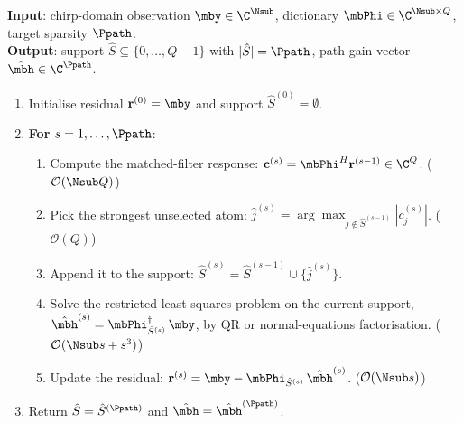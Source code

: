 \begin{algorithm}[t]
\caption{Orthogonal Matching Pursuit on the chirp-domain pilot dictionary~\cite{tropp2007signal}.}
\label{alg:omp}
\begin{small}
\textbf{Input}: chirp-domain observation $\mby \in \C^{\Nsub}$, dictionary $\mbPhi \in \C^{\Nsub \times Q}$, target sparsity $\Ppath$. \\
\textbf{Output}: support $\hat{S} \subseteq \{0, \dots, Q-1\}$ with $|\hat{S}| = \Ppath$, path-gain vector $\hat{\mbh} \in \C^{\Ppath}$.
\begin{enumerate}[leftmargin=*,itemsep=1pt,topsep=2pt]
  \item Initialise residual $\mathbf{r}^{(0)} = \mby$ and support $\hat{S}^{(0)} = \emptyset$.
  \item \textbf{For} $s = 1, \dots, \Ppath$:
  \begin{enumerate}[leftmargin=*,itemsep=1pt,topsep=2pt]
    \item Compute the matched-filter response: $\mathbf{c}^{(s)} = \mbPhi^H \mathbf{r}^{(s-1)} \in \C^{Q}$. \hfill ($\mathcal{O}(\Nsub Q)$)
    \item Pick the strongest unselected atom: $\hat{j}^{(s)} = \arg\max_{j \notin \hat{S}^{(s-1)}} |c_j^{(s)}|$. \hfill ($\mathcal{O}(Q)$)
    \item Append it to the support: $\hat{S}^{(s)} = \hat{S}^{(s-1)} \cup \{\hat{j}^{(s)}\}$.
    \item Solve the restricted least-squares problem on the current support, $\hat{\mbh}^{(s)} = \mbPhi_{\hat{S}^{(s)}}^{\dagger}\, \mby$, by QR or normal-equations factorisation. \hfill ($\mathcal{O}(\Nsub s + s^3)$)
    \item Update the residual: $\mathbf{r}^{(s)} = \mby - \mbPhi_{\hat{S}^{(s)}}\, \hat{\mbh}^{(s)}$. \hfill ($\mathcal{O}(\Nsub s)$)
  \end{enumerate}
  \item Return $\hat{S} = \hat{S}^{(\Ppath)}$ and $\hat{\mbh} = \hat{\mbh}^{(\Ppath)}$.
\end{enumerate}
\end{small}
\end{algorithm}

